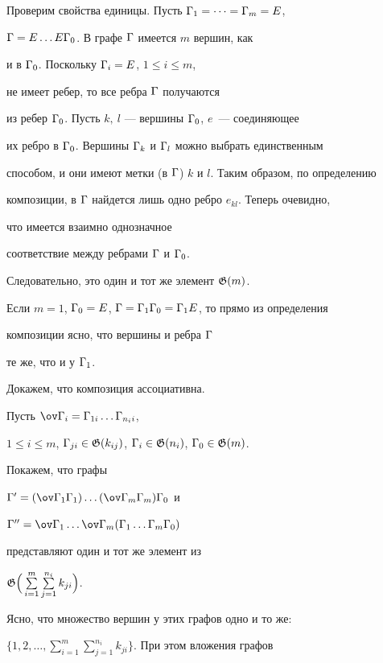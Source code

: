 \begin{pf}


Проверим свойства единицы. Пусть ${\Gamma}_1=\dotsb ={\Gamma}_m=E$,


${\Gamma}=E\dotsc E{\Gamma}_0$. В графе ${\Gamma}$ имеется $m$ вершин, как


и в ${\Gamma}_0$. Поскольку ${\Gamma}_i=E$, $1\leq i\leq m$, 


не имеет ребер, то все ребра ${\Gamma}$ получаются 


из ребер ${\Gamma}_0$. Пусть $k, \ l$ --- вершины ${\Gamma}_0$, $e$~--- соединяющее 


их ребро в ${\Gamma}_0$. Вершины ${\Gamma}_k$ и ${\Gamma}_l$ можно выбрать единственным 


способом, и они имеют метки (в ${\Gamma}$) $k$ и $l$. Таким образом, по определению 


композиции, в ${\Gamma}$ найдется лишь одно ребро $e_{kl}$. Теперь очевидно, 


что имеется взаимно однозначное


соответствие между ребрами ${\Gamma}$ и ${\Gamma}_0$.


Следовательно, это один и тот же элемент ${\frak G} (m)$.


Если $m=1$, ${\Gamma}_0=E$, ${\Gamma}={\Gamma}_1{\Gamma}_0={\Gamma}_1E$, то прямо из определения 


композиции ясно, что вершины и ребра ${\Gamma}$ 


те же, что и у ${\Gamma}_1$.





Докажем, что композиция ассоциативна.  


Пусть $\ov\G_i=\G_{1i}\dotsc \G_{n_ii}$,


$1\leq i\leq m$, ${\Gamma}_{ji}\in {\frak G} (k_{ij})$, ${\Gamma}_i\in {\frak G} (n_i)$, ${\Gamma}_0\in {\frak G} (m)$.


Покажем, что графы 


$\G' =(\ov\G_1\G_1)\dotsc (\ov\G_m\G_m)\G_0$ и


$\G'' =\ov\G_1\dotsc \ov\G_m (\G_1\dotsc \G_m\G_0)$ 


представляют один и тот же элемент из 


${\frak G} \Big(\sum\limits_{i=1}^m\sum\limits_{j=1}^{n_i}k_{ji}\Big)$.





Ясно, что множество вершин у этих графов одно и то же: 


$\Big\{ 1, 2, \dotsc , \sum\limits_{i=1}^m


\sum\limits_{j=1}^{n_i}k_{ji}\Big\}$. При этом вложения графов 



\end{pf}

